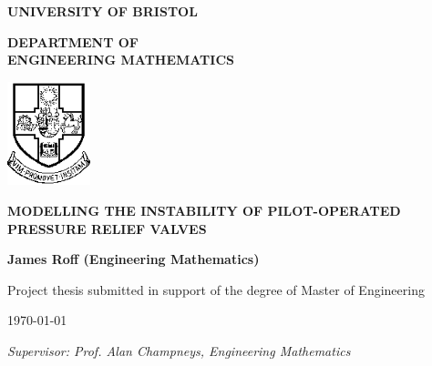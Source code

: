 \begin{titlepage}

\vspace*{1cm}
\begin{center}
    \textbf{\LARGE UNIVERSITY OF BRISTOL}
    
    \vspace{3em}
    
    \textbf{\Huge DEPARTMENT OF \\ \vspace{0.5em} ENGINEERING MATHEMATICS}
    
\end{center}
\vspace{2cm}

\center
\includegraphics[width=0.18\textwidth]{bristol_logo.png}\par

\vspace{2cm}

{ \huge \bfseries MODELLING THE INSTABILITY OF \newline \newline
PILOT-OPERATED PRESSURE RELIEF \newline \newline
VALVES
}\\

\vspace{2cm}

{ \large \bfseries James Roff (Engineering Mathematics)
}\\

\vspace{2cm}

{\large Project thesis submitted in support of the degree of Master of Engineering}

\vspace{0.5cm}

\today

\vspace{0.5em}
\vspace{0.9cm}


\raggedright \textit{Supervisor: Prof. Alan Champneys,  Engineering Mathematics}

\end{titlepage}